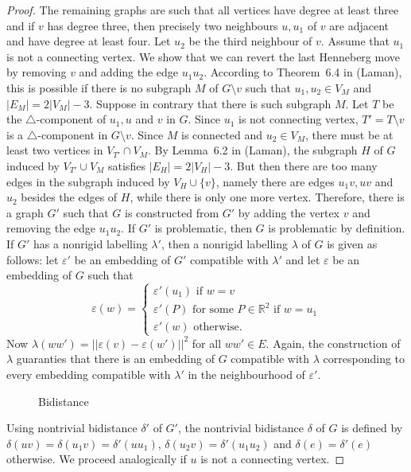 \documentclass[a4paper, 11pt]{article}
\newcommand{\trcomp}{$\triangle$-component}
\newcommand{\RR}{\mathbb{R}}
\theoremstyle{definition}
\begin{document}
\begin{proof}
The remaining graphs are such that all vertices have degree at least three and if $v$ has degree three, then precisely two neighbours $u,u_1$ of $v$ are adjacent and have degree at least four. Let $u_2$ be the third neighbour of $v$. Assume that $u_1$ is not a connecting vertex. We show that we can revert the last Henneberg move by removing $v$ and adding the edge $u_1u_2$. According to Theorem~6.4 in (Laman), this is possible if there is no subgraph $M$ of $G\setminus v$ such that $u_1,u_2\in V_M$ and $|E_M|=2|V_M|-3$. Suppose in contrary that there is such subgraph $M$. Let $T$ be the \trcomp{} of $u_1, u$ and $v$ in $G$. Since $u_1$ is not connecting vertex, $T'=T\setminus v$ is a \trcomp{} in $G\setminus v$. Since $M$ is connected and $u_2\in V_M$, there must be at least two vertices in $V_{T'}\cap V_M$. By Lemma~6.2 in  (Laman), the subgraph $H$ of $G$ induced by $V_{T'}\cup V_M$ satisfies $|E_H|=2|V_H|-3$. But then there are too many edges in the subgraph induced by $V_H\cup\{v\}$, namely there are edges $u_1v, uv$ and $u_2$ besides the edges of $H$, while there is only one more vertex. Therefore, there is a graph $G'$ such that $G$ is constructed from $G'$ by adding the vertex $v$ and removing the edge $u_1u_2$. If $G'$ is problematic, then $G$ is problematic by definition. If $G'$ has a nonrigid labelling $\lambda'$, then a nonrigid labelling $\lambda$ of $G$ is given as follows: let $\varepsilon'$ be an embedding of $G'$ compatible with $\lambda'$ and let $\varepsilon$ be an embedding of $G$ such that 
$$
\varepsilon(w)=\begin{cases}
\varepsilon'(u_1) \text{ if } w=v\\
\varepsilon'(P) \text{ for some }P\in \RR^2 \text{ if } w=u_1\\
\varepsilon'(w) \text{ otherwise.}
\end{cases}
$$
Now $\lambda(ww')=||\varepsilon(v)-\varepsilon(w')||^2$ for all $ww'\in E$. Again, the construction of $\lambda$ guaranties that there is an embedding of $G$ compatible with $\lambda$ corresponding to every embedding compatible with $\lambda'$ in the neighbourhood of $\varepsilon'$.
\begin{figure}[htb!]
\centering

\caption{Bidistance}
\label{fig:IIbnotConnectingVertex}
\end{figure}

Using nontrivial bidistance $\delta'$ of $G'$, the nontrivial bidistance $\delta$ of $G$ is defined by $\delta(uv)=\delta(u_1v)=\delta'(uu_1)$, $\delta(u_2v)=\delta'(u_1u_2)$ and $\delta(e)=\delta'(e)$ otherwise. We proceed analogically if $u$ is not a connecting vertex.


\end{proof}
\end{document}
